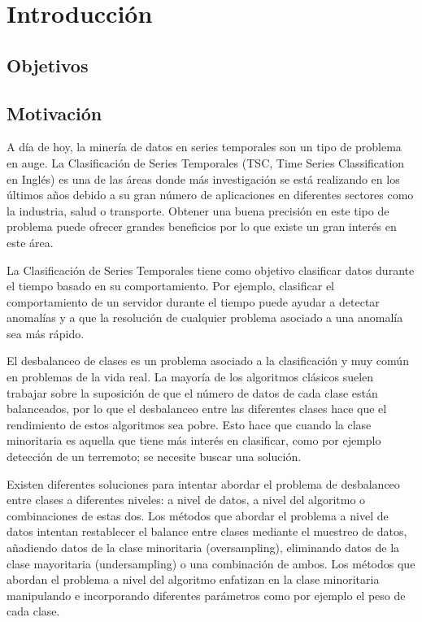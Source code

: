 \chapter{Introducción}
\section{Objetivos}
\newpage
\section{Motivación}
A día de hoy, la minería de datos en series temporales son un tipo de problema en auge. La Clasificación de Series Temporales (TSC, Time Series Classification en Inglés) es una de las áreas donde más investigación se está realizando en los últimos años debido a su gran número de aplicaciones en diferentes sectores como la industria, salud o transporte. Obtener una buena precisión en este tipo de problema puede ofrecer grandes beneficios por lo que existe un gran interés en este área.\newline

La Clasificación de Series Temporales tiene como objetivo clasificar datos durante el tiempo basado en su comportamiento. Por ejemplo, clasificar el comportamiento de un servidor durante el tiempo puede ayudar a detectar anomalías y a que la resolución de cualquier problema asociado a una anomalía sea más rápido.\newline

El desbalanceo de clases es un problema asociado a la clasificación y muy común en problemas de la vida real. La mayoría de los algoritmos clásicos suelen trabajar sobre la suposición de que el número de datos de cada clase están balanceados, por lo que el desbalanceo entre las diferentes clases hace que el rendimiento de estos algoritmos sea pobre. Esto hace que cuando la clase minoritaria es aquella que tiene más interés en clasificar, como por ejemplo detección de un terremoto; se necesite buscar una solución.\newline

Existen diferentes soluciones para intentar abordar el problema de desbalanceo entre clases a diferentes niveles: a nivel de datos, a nivel del algoritmo o combinaciones de estas dos. Los métodos que abordar el problema a nivel de datos intentan restablecer el balance entre clases mediante el muestreo de datos, añadiendo datos de la clase minoritaria (oversampling), eliminando datos de la clase mayoritaria (undersampling) o una combinación de ambos. Los métodos que abordan el problema a nivel del algoritmo enfatizan en la clase minoritaria manipulando e incorporando diferentes parámetros como por ejemplo el peso de cada clase.\newline

